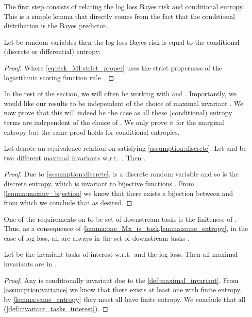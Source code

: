 \documentclass[final]{article}
\begin{document}
The first step consists of relating the log loss Bayes risk and conditional entropy. 
This is a simple lemma that directly comes from the fact that the conditional distribution   is the Bayes predictor.

\begin{lemma}\label{lemma:risk_entropy}
Let  be random variables then the log loss Bayes risk is equal to the conditional (discrete or differential) entropy:

\end{lemma}
\begin{proof}

Where \cref{eq:risk_MI:strict_proper} uses the strict properness of the logarithmic scoring function rule \citep{gneiting_strictly_2007}.
\end{proof}

In the rest of the section, we will often be working with  and  . 
Importantly, we would like our results to be independent of the choice of maximal invariant .
We now prove that this will indeed be the case as all these (conditional) entropy terms are independent of the choice of .
We only prove it for the marginal entropy  but the same proof holds for conditional entropies.

\begin{lemma}\label{lemma:same_entropy}
Let  denote an equivalence relation on  satisfying \cref{assumption:discrete}.
Let  and  be two different maximal invariants w.r.t.\  . Then .
\end{lemma}
\begin{proof}
Due to \cref{assumption:discrete},  is a discrete random variable and so  is the discrete entropy, which is invariant to bijective functions \cite{kraskov_estimating_2004}.
From \cref{lemma:maxinv_bijection} we know that there exists a bijection between  and  from which we conclude that  as desired.
\end{proof}



One of the requirements on  to be set of downstream tasks  is the finiteness of . Thus, as a consequence of \cref{lemma:one_Mx_is_task,lemma:same_entropy}, in the case of log loss, all  are always in the set of downstream tasks .


\begin{lemma}\label{lemma:all_Mx_is_task}
Let  be the invariant tasks of interest w.r.t.\   and the log loss.
Then all maximal invariants are in .
\end{lemma}
\begin{proof}
Any  is conditionally invariant due to the \cref{def:maximal_invariant}.
From \cref{assumption:variance} we know that there exists at least one  with finite entropy, by \cref{lemma:same_entropy} they must all have finite entropy.
We conclude that all  (\cref{def:invariant_tasks_interest}).
\end{proof}
\end{document}
